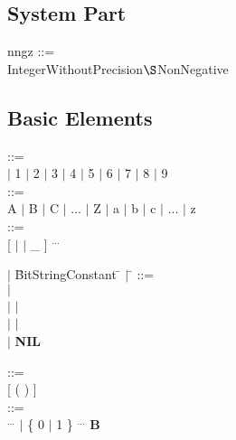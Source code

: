 \subsection{System Part}   %








\begin{removed}
nngz ::= \\
\x IntegerWithoutPrecision$\S $NonNegative
\end{removed}


\subsection{Basic Elements}    %

 ::=\\
 $\mid$ 1 $\mid$ 2 $\mid$ 3 $\mid$ 4 $\mid$ 5 $\mid$ 6 $\mid$ 7 $\mid$ 8 $\mid$ 9\\

 ::= \\
\x A $\mid$ B $\mid$ C $\mid$ ... $\mid$ Z $\mid$ a $\mid$ b $\mid$ c $\mid$ ... $\mid$ z\\

 ::=\\
\x {} [  $\mid$  $\mid$ \_ ] $^{...}$\\

\begin{tabbing}
\x $\mid$ \= BitStringConstant \= $\mid$ \= \kill
{} ::= \> \> \> \\
          \>    \> $\mid$ \> \\
\x $\mid$ \>  \> $\mid$ \> \\
\x $\mid$ \>  \> $\mid$ \> \\
\x $\mid$ {\bf NIL} \\

\end{tabbing}

 ::=\\
\x {} [ (  ) ]\\

 ::=\\
\x {} $^{...}$ $\mid$ \{ 0 $\mid$ 1 \} $^{...}$ {\bf B}\\

